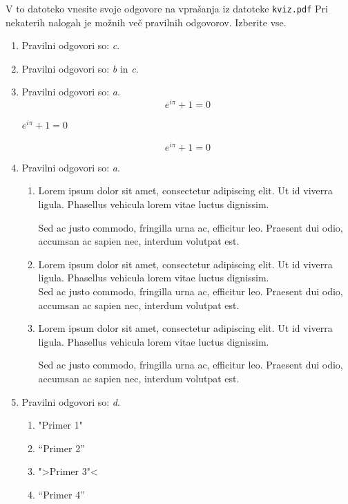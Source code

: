 \documentclass[11pt]{article}
\begin{document}
V to datoteko vnesite svoje odgovore na vprašanja iz datoteke \texttt{kviz.pdf}
Pri nekaterih nalogah je možnih več pravilnih odgovorov. Izberite vse.

\begin{enumerate}
    \item Pravilni odgovori so: \emph{c}.
    
    \item Pravilni odgovori so: \emph{b} in \emph{c}.
    
    \item Pravilni odgovori so:  \emph{a}.
      \[ e^{i \pi} + 1 = 0 \]
      \begin{center}
          \( e^{i \pi} + 1 = 0 \)
      \end{center}
      \begin{equation*}
          e^{i \pi} + 1 = 0
      \end{equation*}

    \item Pravilni odgovori so: \emph{a}.
        \begin{enumerate}
            \item {
Lorem ipsum dolor sit amet, consectetur adipiscing 
elit. Ut id viverra ligula. Phasellus vehicula lorem 
vitae luctus dignissim. 
                
Sed ac justo commodo, fringilla urna ac, efficitur 
leo. Praesent dui odio, accumsan ac sapien nec, 
interdum volutpat est. 
            }
            \item {
Lorem ipsum dolor sit amet, consectetur adipiscing 
elit. Ut id viverra ligula. Phasellus vehicula lorem 
vitae luctus dignissim. \\
Sed ac justo commodo, fringilla urna ac, efficitur 
leo. Praesent dui odio, accumsan ac sapien nec, 
interdum volutpat est.             }
            \item {
Lorem ipsum dolor sit amet, consectetur adipiscing 
elit. Ut id viverra ligula. Phasellus vehicula lorem 
vitae luctus dignissim. \par
Sed ac justo commodo, fringilla urna ac, efficitur 
leo. Praesent dui odio, accumsan ac sapien nec, 
interdum volutpat est.             }
        \end{enumerate}
    
      \item Pravilni odgovori so: \emph{d}.
        \begin{enumerate}
          \item "Primer 1"
          \item ``Primer 2''
          \item ">Primer 3"<
          \item "`Primer 4"'
        \end{enumerate}


\end{enumerate}
\end{document}
